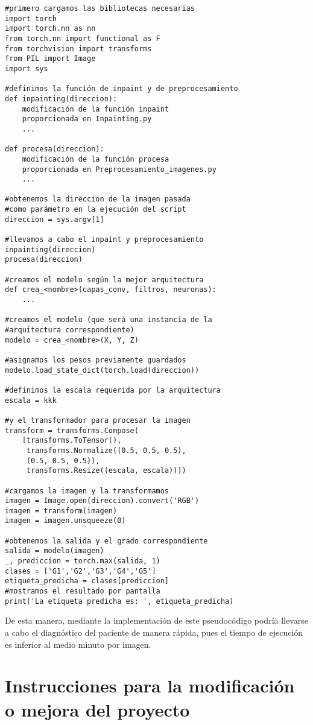 \begin{itemize}
\begin{verbatim}
#primero cargamos las bibliotecas necesarias
import torch
import torch.nn as nn
from torch.nn import functional as F
from torchvision import transforms
from PIL import Image
import sys

#definimos la función de inpaint y de preprocesamiento
def inpainting(direccion):
    modificación de la función inpaint
    proporcionada en Inpainting.py
    ...

def procesa(direccion):
    modificación de la función procesa
    proporcionada en Preprocesamiento_imagenes.py
    ...

#obtenemos la direccion de la imagen pasada 
#como parámetro en la ejecución del script
direccion = sys.argv[1]

#llevamos a cabo el inpaint y preprocesamiento
inpainting(direccion)
procesa(direccion)

#creamos el modelo según la mejor arquitectura
def crea_<nombre>(capas_conv, filtros, neuronas):
    ...

#creamos el modelo (que será una instancia de la
#arquitectura correspondiente)
modelo = crea_<nombre>(X, Y, Z)

#asignamos los pesos previamente guardados
modelo.load_state_dict(torch.load(direccion))

#definimos la escala requerida por la arquitectura
escala = kkk

#y el transformador para procesar la imagen
transform = transforms.Compose(
    [transforms.ToTensor(), 
     transforms.Normalize((0.5, 0.5, 0.5),
     (0.5, 0.5, 0.5)),
     transforms.Resize((escala, escala))])

#cargamos la imagen y la transformamos
imagen = Image.open(direccion).convert('RGB')
imagen = transform(imagen)
imagen = imagen.unsqueeze(0)

#obtenemos la salida y el grado correspondiente
salida = modelo(imagen)
_, prediccion = torch.max(salida, 1)
clases = ['G1','G2','G3','G4','G5']
etiqueta_predicha = clases[prediccion]
#mostramos el resultado por pantalla
print('La etiqueta predicha es: ', etiqueta_predicha)
\end{verbatim}

De esta manera, mediante la implementación de este pseudocódigo podría llevarse a cabo el diagnóstico del paciente de manera rápida, pues el tiempo de ejecución es inferior al medio minuto por imagen.

\section{Instrucciones para la modificación o mejora del proyecto}


\end{itemize}
